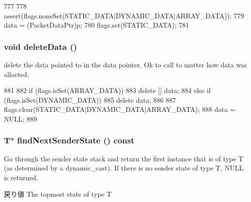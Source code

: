 \begin{DoxyCode}
777     {
778         assert(flags.noneSet(STATIC_DATA|DYNAMIC_DATA|ARRAY_DATA));
779         data = (PacketDataPtr)p;
780         flags.set(STATIC_DATA);
781     }
\end{DoxyCode}
\hypertarget{classPacket_a01374b232898f3d3c134623ffded84af}{
\subsubsection[{deleteData}]{\setlength{\rightskip}{0pt plus 5cm}void deleteData ()}}
\label{classPacket_a01374b232898f3d3c134623ffded84af}
delete the data pointed to in the data pointer. Ok to call to matter how data was allocted. 


\begin{DoxyCode}
881     {
882         if (flags.isSet(ARRAY_DATA))
883             delete [] data;
884         else if (flags.isSet(DYNAMIC_DATA))
885             delete data;
886 
887         flags.clear(STATIC_DATA|DYNAMIC_DATA|ARRAY_DATA);
888         data = NULL;
889     }
\end{DoxyCode}
\hypertarget{classPacket_a55ab7685d5e3c590ee23ca4ec7c3c0a0}{
\subsubsection[{findNextSenderState}]{\setlength{\rightskip}{0pt plus 5cm}T$\ast$ findNextSenderState () const}}
\label{classPacket_a55ab7685d5e3c590ee23ca4ec7c3c0a0}
Go through the sender state stack and return the first instance that is of type T (as determined by a dynamic\_\-cast). If there is no sender state of type T, NULL is returned.

\begin{DoxyReturn}{戻り値}
The topmost state of type T 
\end{DoxyReturn}



